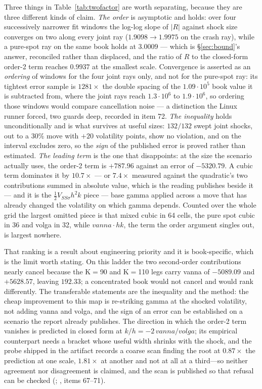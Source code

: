 \documentclass[11pt,a4paper]{article}
\begin{document}
Three things in Table~\ref{tab:twofactor} are worth separating, because they are three different
kinds of claim. \emph{The order} is asymptotic and holds: over four successively narrower fit
windows the log-log slope of $\lvert R\rvert$ against shock size converges on two along every joint
ray ($1.9098 \to 1.9975$ on the crash ray), while a pure-spot ray on the same book holds at
$3.0009$ --- which is \S\ref{sec:bound}'s answer, reconciled rather than displaced, and the ratio of
$R$ to the closed-form order-2 term reaches $0.9937$ at the smallest scale. Convergence is asserted
as an \emph{ordering} of windows for the four joint rays only, and not for the pure-spot ray: its
tightest error sample is $1281\times$ the double spacing of the $1.09\cdot10^5$ book value it is
subtracted from, where the joint rays reach $1.3\cdot10^6$ to $1.9\cdot10^6$, so ordering those
windows would compare cancellation noise --- a distinction the Linux runner forced, two guards deep,
recorded in  item 72. \emph{The inequality}
holds unconditionally and is what survives at useful sizes: $132/132$ swept joint shocks, out to a
$30\%$ move with $+20$ volatility points, show no violation, and on  the interval
excludes zero, so the \emph{sign} of the published error is proved rather than estimated. \emph{The
leading term} is the one that disappoints: at the size the scenario actually uses, the order-2 term
is $+787.96$ against an error of $-5320.79$. A cubic term dominates it by $10.7\times$ --- or
$7.4\times$ measured against the quadratic's two contributions summed in absolute value, which is
the reading  publishes beside it --- and it is the
$\tfrac12 V_{SS\sigma}h^2k$ piece --- base gamma applied across a move that has already changed the
volatility on which gamma depends. Counted over the whole grid the largest omitted piece is that
mixed cubic in 64 cells, the pure spot cubic in 36 and volga in 32, while $vanna \cdot hk$, the term
the order argument singles out, is largest nowhere.

That ranking is a result about engineering priority and it is book-specific, which is the limit
worth stating. On this ladder the two second-order contributions nearly cancel because the K$=$90 and
K$=$110 legs carry vanna of $-5089.09$ and $+5628.57$, leaving $192.33$; a concentrated book would
not cancel and would rank differently. The transferable statements are the inequality and the
method: the cheap improvement to this map is re-striking gamma at the shocked volatility, not adding
vanna and volga, and the sign of an error can be established on a scenario the report already
publishes. The direction in which the order-2 term vanishes is predicted in closed form at
$k/h = -2\,vanna/volga$; its empirical counterpart needs a bracket whose useful width shrinks with
the shock, and the probe shipped in the artifact records a coarse scan finding the root at
$0.87\times$ the prediction at one scale, $1.81\times$ at another and not at all at a third---so
neither agreement nor disagreement is claimed, and the scan is published so that refusal can be
checked (; , items
67--71).
\end{document}
